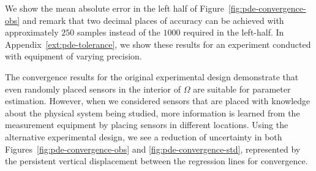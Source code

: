 We show the mean absolute error in the left half of Figure~\ref{fig:pde-convergence-obs} and remark that two decimal places of accuracy can be achieved with approximately $250$ samples instead of the $1000$ required in the left-half.
In Appendix~\ref{ext:pde-tolerance}, we show these results for an experiment conducted with equipment of varying precision.

The convergence results for the original experimental design demonstrate that even randomly placed sensors in the interior of $\Omega$ are suitable for parameter estimation.
However, when we considered sensors that are placed with knowledge about the physical system being studied, more information is learned from the measurement equipment by placing sensors in different locations.
Using the alternative experimental design, we see a reduction of uncertainty in both Figures~\ref{fig:pde-convergence-obs} and \ref{fig:pde-convergence-std}, represented by the persistent vertical displacement between the regression lines for convergence.


\FloatBarrier
%
